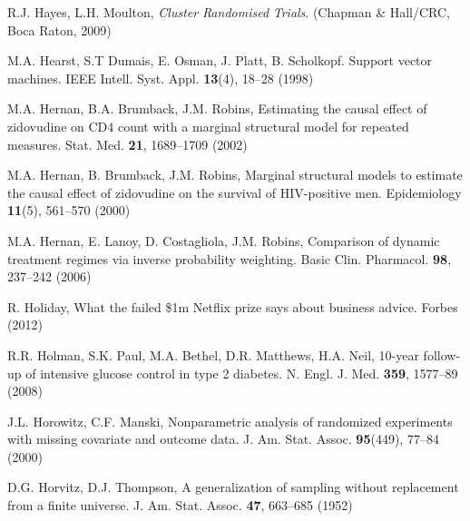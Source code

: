 \begin{list}{}{\setlength{\leftmargin}{2.1em}\setlength{\labelwidth}{0pt}
  \setlength{\labelsep}{0pt}\setlength{\itemindent}{-2.1em}
  \setlength{\parsep}{0pt}\setlength{\itemsep}{2pt}\setlength{\topsep}{0pt}}
\item\label{refentry:REF151}R.J. Hayes, L.H. Moulton, \textit{Cluster} \textit{Randomised} \textit{Trials}. (Chapman \& Hall/CRC, Boca Raton, 2009)\label{refend:REF151}
\item\label{refentry:REF152}M.A. Hearst, S.T Dumais, E. Osman, J. Platt, B. Scholkopf. Support vector machines. IEEE Intell. Syst. Appl. \textbf{13}(4), 18--28 (1998)\label{refend:REF152}
\item\label{refentry:REF153}M.A. Hernan, B.A. Brumback, J.M. Robins, Estimating the causal effect of zidovudine on CD4 count with a marginal structural model for repeated measures. Stat. Med. \textbf{21}, 1689--1709 (2002)\label{refend:REF153}
\item\label{refentry:REF154}M.A. Hernan, B. Brumback, J.M. Robins, Marginal structural models to estimate the causal effect of zidovudine on the survival of HIV-positive men. Epidemiology \textbf{11}(5), 561--570 (2000)\label{refend:REF154}
\item\label{refentry:REF155}M.A. Hernan, E. Lanoy, D. Costagliola, J.M. Robins, Comparison of dynamic treatment regimes via inverse probability weighting. Basic Clin. Pharmacol. \textbf{98}, 237--242 (2006)\label{refend:REF155}
\item\label{refentry:REF156}R. Holiday, What the failed \$1m Netflix prize says about business advice. Forbes (2012)\label{refend:REF156}
\item\label{refentry:REF157}R.R. Holman, S.K. Paul, M.A. Bethel, D.R. Matthews, H.A. Neil, 10-year follow-up of intensive glucose control in type 2 diabetes. N. Engl. J. Med. \textbf{359}, 1577--89 (2008)\label{refend:REF157}
\item\label{refentry:REF158}J.L. Horowitz, C.F. Manski, Nonparametric analysis of randomized experiments with missing covariate and outcome data. J. Am. Stat. Assoc. \textbf{95}(449), 77--84 (2000)\label{refend:REF158}
\item\label{refentry:REF159}D.G. Horvitz, D.J. Thompson, A generalization of sampling without replacement from a finite universe. J. Am. Stat. Assoc. \textbf{47}, 663--685 (1952)\label{refend:REF159}

\end{list}
